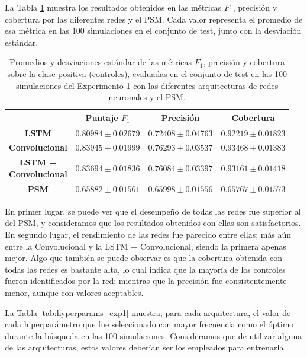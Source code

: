 \documentclass[../../main.tex]{subfiles}
\begin{document}
La Tabla \ref{tab:results_exp1} muestra los resultados obtenidos en las métricas \(F_1\),
precisión y cobertura por las diferentes redes y el PSM. Cada valor representa el
promedio de esa métrica en las 100 simulaciones en el conjunto de test, junto con la
desviación estándar.

\begin{table}[H]
    \centering
    \renewcommand{\arraystretch}{1.2}
    \begin{tabular}{|c|c|c|c|}
        \hline
        & \textbf{Puntaje} \(F_1\) & \textbf{Precisión} & \textbf{Cobertura} \\ \hline\hline
        \textbf{LSTM}
            & $0.80984 \pm 0.02679$ & $0.72408 \pm 0.04763$ & $0.92219 \pm 0.01823$ \\ \hline
        \textbf{Convolucional}
            & $\mathbf{0.83945 \pm 0.01999}$ & $\mathbf{0.76293 \pm 0.03537}$ & $\mathbf{0.93468 \pm 0.01383}$ \\ \hline
        \makecell{\textbf{LSTM +}\\\textbf{Convolucional}}
            & $0.83694 \pm 0.01836$ & $0.76084 \pm 0.03397$ & $0.93161 \pm 0.01418$ \\ \hline
        \textbf{PSM}
            & $0.65882 \pm 0.01561$ & $0.65998 \pm 0.01556$ & $0.65767 \pm 0.01573$ \\
        \hline
    \end{tabular}

    \caption{Promedios y desviaciones estándar de las métricas \(F_1\), precisión y
    cobertura sobre la clase positiva (controles), evaluadas en el conjunto de test en las
    100 simulaciones del Experimento 1 con las diferentes arquitecturas de redes
    neuronales y el PSM.}
    \label{tab:results_exp1}
\end{table}

En primer lugar, se puede ver que el desempeño de todas las redes fue superior al del PSM,
y consideramos que los resultados obtenidos con ellas son satisfactorios. En segundo
lugar, el rendimiento de las redes fue parecido entre ellas; más aún entre la
Convolucional y la LSTM + Convolucional, siendo la primera apenas mejor. Algo que también
se puede observar es que la cobertura obtenida con todas las redes es bastante alta, lo
cual indica que la mayoría de los controles fueron identificados por la red; mientras que
la precisión fue consistentemente menor, aunque con valores aceptables.

La Tabla \ref{tab:hyperparams_exp1} muestra, para cada arquitectura, el valor de cada
hiperparámetro que fue seleccionado con mayor frecuencia como el óptimo durante la
búsqueda en las 100 simulaciones. Consideramos que de utilizar alguna de las
arquitecturas, estos valores deberían ser los empleados para entrenarla.
\end{document}
